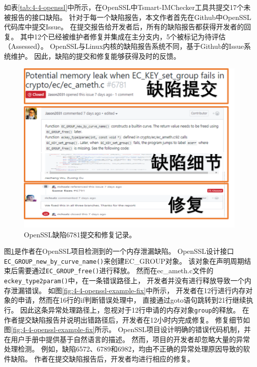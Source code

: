如表\ref{tab:4-4-openssl}中所示，在OpenSSL中Tsmart-IMChecker工具共提交17个未被报告的接口缺陷。
针对于每一个缺陷报告，本文作者首先在Github中OpenSSL代码库中提交Issue。
在提交报告给开发者后，所有的缺陷报告都获得开发者的回复。
其中12个已经被维护者修复并集成在主分支内，5个被标记为待评估（Assessed）。
OpenSSL与Linux内核的缺陷报告系统不同，基于Github的Issue系统维护。
因此，缺陷的提交和修复能够获得及时的反馈。

\begin{figure}[t]
	\centering
	\includegraphics[width=0.8\linewidth]{figures/cp4-openssl-example.png}
	\caption{
		OpenSSL缺陷6781提交和修复记录。
	}
	\label{fig:4-4-openssl-example}
\end{figure}





图\ref{fig:4-4-openssl-example}是作者在OpenSSL项目检测到的一个内存泄漏缺陷。
OpenSSL设计接口\texttt{EC\_GROUP\_new\_by\_curve\_name()}来创建EC\_GROUP对象。
该对象在声明周期结束后需要通过\texttt{EC\_GROUP\_free()}进行释放。
然而在ec\_ameth.c文件的\texttt{eckey\_type2param()}中，在一条错误路径上，
开发者并没有进行释放导致一个内存泄漏错误。
如图\ref{fig:4-4-openssl-example-fix}中所示，
开发者在12行进行内存对象的申请，然而在16行的if判断错误处理中，
直接通过goto语句跳转到21行继续执行。
因此这条异常处理路径上，忽视对于12行申请的内存对象\texttt{group}的释放。
在作者提交缺陷报告并说明出错路径后，开发者在12小时内完成修复。
修复细节如图\ref{fig:4-4-openssl-example-fix}所示。
OpenSSL项目设计明确的错误代码机制，并在用户手册中提供基于自然语言的描述。
然而，项目的开发者却忽略大量的异常处理检测。
例如，缺陷6572、6789和6982，均由不正确的异常处理原因导致的软件缺陷。
作者在提交缺陷报告后，开发者均进行相应的修复。





